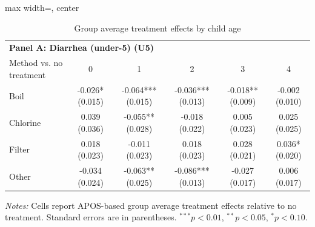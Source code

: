 \begin{table}[p]
\centering
\caption{Group average treatment effects by child age}
\label{tab:gate_childage}
\small
\setlength{\tabcolsep}{4pt}
\begin{adjustbox}{max width=\linewidth, center}
\begin{tabular}{lccccc}
\toprule
\multicolumn{6}{l}{\textbf{Panel A: Diarrhea (under-5) (U5)}} \\
Method vs. no treatment & 0 & 1 & 2 & 3 & 4 \\
\midrule
Boil & -0.026* (0.015) & -0.064*** (0.015) & -0.036*** (0.013) & -0.018** (0.009) & -0.002 (0.010) \\
Chlorine & 0.039 (0.036) & -0.055** (0.028) & -0.018 (0.022) & 0.005 (0.023) & 0.025 (0.025) \\
Filter & 0.018 (0.023) & -0.011 (0.023) & 0.018 (0.023) & 0.028 (0.021) & 0.036* (0.020) \\
Other & -0.034 (0.024) & -0.063** (0.025) & -0.086*** (0.013) & -0.027 (0.017) & 0.006 (0.017) \\
\bottomrule
\end{tabular}
\end{adjustbox}
\par\vspace{3pt}
\begin{minipage}{\linewidth}\footnotesize \textit{Notes:} Cells report APOS-based group average treatment effects relative to no treatment. Standard errors are in parentheses. $^{***}p<0.01$, $^{**}p<0.05$, $^{*}p<0.10$.\end{minipage}
\end{table}
